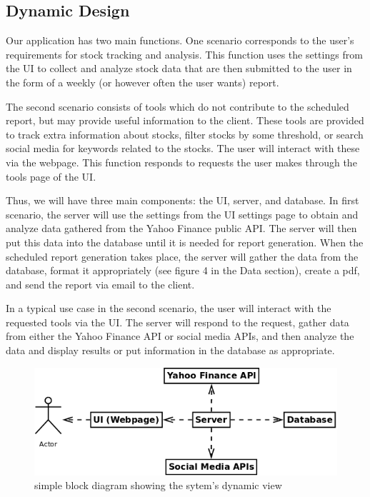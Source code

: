 \documentclass[12pt,a4paper]{article}
\begin{document}
\subsection{Dynamic Design}

Our application has two main functions. One scenario corresponds to the user's requirements for stock tracking and analysis. This function uses the settings from the UI to collect and analyze stock data that are then submitted to the user in the form of a weekly (or however often the user wants) report. 
\vspace{.1cm}

\indent The second scenario consists of tools which do not contribute to the scheduled report, but may provide useful information to the client. These tools are provided to track extra information about stocks, filter stocks by some threshold, or search social media for keywords related to the stocks. The user will interact with these via the webpage. This function responds to requests the user makes through the tools page of the UI. 
\vspace{.1cm}

\indent Thus, we will have three main components: the UI, server, and database. In first scenario, the server will use the settings from the UI settings page to obtain and analyze data gathered from the Yahoo Finance public API. The server will then put this data into the database until it is needed for report generation. When the scheduled report generation takes place, the server will gather the data from the database, format it appropriately (see figure 4 in the Data section), create a pdf, and send the report via email to the client.

In a typical use case in the second scenario, the user will interact with the requested tools via the UI. The server will respond to the request, gather data from either the Yahoo Finance API or social media APIs, and then analyze the data and display results or put information in the database as appropriate. 

\begin{figure}[h!]
  \centering
  \includegraphics[scale=0.4]{UML_block.png}
  \caption{simple block diagram showing the sytem's dynamic view}
\end{figure}
\end{document}
